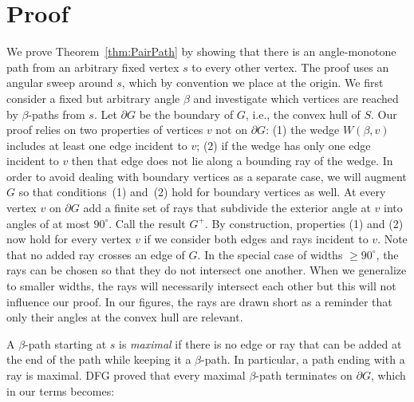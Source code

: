 \documentclass{cccg17}
\newcommand{\bluenew}[1]{{#1}}  %
\newcommand{\cyannew}[1]{{#1}}  %
\newcommand{\rednote}[1]{{}}  %
\newcommand{\seclab}[1]{\label{sec:#1}}
\newcommand{\thmref}[1]{\ref{thm:#1}}
\def\b{{\beta}}
\def\bG{{\partial G}}
\begin{document}
\section{Proof}
\seclab{Proof}
We prove Theorem~\thmref{PairPath} by showing that there is an angle-monotone path from an arbitrary fixed vertex $s$ to every other vertex. 
The proof uses an angular sweep \bluenew{around} $s$,
which by convention we place  
at the origin. 
\cyannew{We first consider 
a fixed \bluenew{but arbitrary} angle $\b$ and
investigate} 
\rednote{AL: just more active verbs.}
which vertices are reached by $\b$-paths from $s$. 
Let $\bG$ be the boundary of $G$, i.e., the convex hull of $S$.  
Our \bluenew{proof relies} on two properties of vertices $v$ not on $\bG$: 
(1) the wedge $W(\b,v)$ includes at least one edge incident to $v$; 
(2) if the wedge has only one edge incident to $v$ then that edge does not lie along a bounding ray of the wedge.
\rednote{Rev1:
``I found a bit confusing that properties (1) and (2) are stated after an angle $\beta$ has been fixed. Now it is true that $\beta$ has no specific value; yet I guess it would be better to state properties (1) and (2) for *any* angle $\beta$, and then to fix $\beta$ to any specific value.''
JOR: Minor confusion. I fixed with the ``\bluenew{but arbitrary}" above.}
In order to avoid dealing with boundary vertices as a separate case, we will augment $G$ so that conditions~(1) and~(2) hold for boundary vertices as well.  
At every vertex $v$ on $\bG$ add 
a finite set of rays that subdivide the exterior angle at $v$ into angles of at most $90^\circ$.
Call the result $G^+$.  By construction, properties (1) and (2) now hold for every vertex $v$ if we consider both edges and rays incident to $v$. 
Note that no added ray crosses an edge of $G$.  In the special case of 
\bluenew{widths $\ge 90^\circ$}, the rays can be chosen so that they do not intersect 
one another.
\rednote{Rev1: ``I guess this is true for any angle $\ge 90^\circ$, and not only for $90^\circ$."
JOR: Good point, we just use $=90^\circ$ even for $\gamma > 90^\circ$. Do not think it worthwhile
to explain, so just a silent change.}
When we generalize to smaller widths, the rays will necessarily intersect each other but this will not  
influence our proof.  In our figures, the rays are drawn short as a reminder that only their angles at the convex hull are relevant.


A $\b$-path starting at $s$ is \emph{maximal} if there is no edge or ray that can be added at the end of the path while keeping it a $\b$-path.  In particular, a path ending with a ray is maximal.  DFG proved that every maximal $\b$-path terminates on $\bG$, which in our terms becomes:
\end{document}
